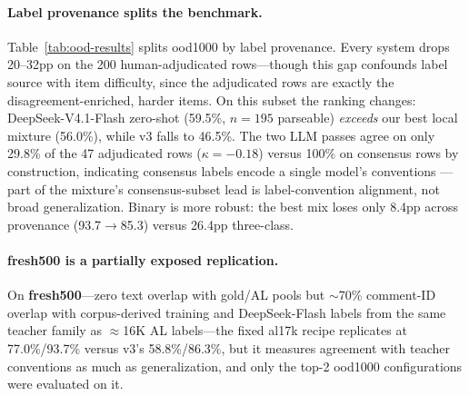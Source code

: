 \paragraph{Label provenance splits the benchmark.}
Table~\ref{tab:ood-results} splits ood1000 by label provenance. Every
system drops 20--32pp on the 200 human-adjudicated rows---though this
gap confounds label source with item difficulty, since the adjudicated
rows are exactly the disagreement-enriched, harder items. On this
subset the ranking changes: DeepSeek-V4.1-Flash zero-shot (59.5\%,
$n{=}195$ parseable) \emph{exceeds} our best local mixture (56.0\%),
while v3 falls to 46.5\%. The two LLM passes agree on only 29.8\% of
the 47 adjudicated rows ($\kappa{=}{-}0.18$) versus 100\% on consensus
rows by construction, indicating consensus labels encode a single
model's conventions \citep{schroeder2025humanloop,moller2024parrot}
---part of the mixture's consensus-subset lead is label-convention
alignment, not broad generalization. Binary is more robust: the best
mix loses only 8.4pp across provenance (93.7$\to$85.3) versus 26.4pp
three-class.

\paragraph{fresh500 is a partially exposed replication.}
On \textbf{fresh500}---zero text overlap with gold/AL pools but
$\sim$70\% comment-ID overlap with corpus-derived training and
DeepSeek-Flash labels from the same teacher family as $\approx$16K AL
labels---the fixed al17k recipe replicates at 77.0\%/93.7\% versus
v3's 58.8\%/86.3\%, but it measures agreement with teacher
conventions as much as generalization, and only the top-2 ood1000
configurations were evaluated on it.

